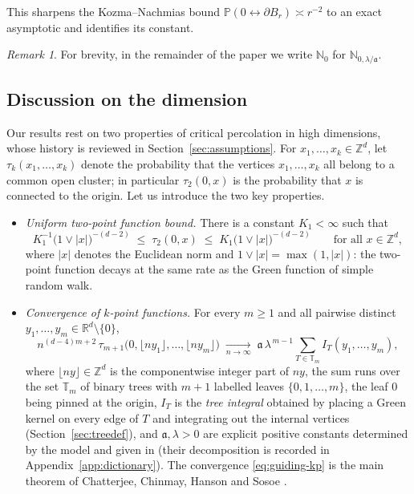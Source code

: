 \documentclass[11pt]{article}
\theoremstyle{definition}
\theoremstyle{remark}
\newtheorem{remark}[theorem]{Remark}
\newcommand{\R}{\mathbb{R}}
\newcommand{\Z}{\mathbb{Z}}
\newcommand{\bP}{\mathbb{P}}
\newcommand{\bN}{{\mathbb{N}_0}}                 %
\newcommand{\T}{\mathbb{T}}                    %
\newcommand{\fl}[1]{\lfloor #1\rfloor}
\numberwithin{equation}{section}
\theoremstyle{plain}
\theoremstyle{definition}
\theoremstyle{remark}
\theoremstyle{plain}
\begin{document}
This sharpens the Kozma--Nachmias bound
$\bP(0\leftrightarrow\partial B_r)\asymp r^{-2}$ \cite{KN11} to an exact
asymptotic and identifies its constant.

\begin{remark}
For brevity, in the remainder of the paper we write $\bN$ for $\mathbb{N}_{0,\lambda/\mathfrak a}$.
\end{remark}

\subsection{Discussion on the dimension}

Our results rest on two properties of critical percolation in high dimensions,
whose history is reviewed in Section~\ref{sec:assumptions}. For
$x_1,\dots,x_k\in\Z^d$, let $\tau_k(x_1,\dots,x_k)$ denote the probability
that the vertices $x_1,\dots,x_k$ all belong to a common open cluster; in
particular
$\tau_2(0,x)$ is the probability that $x$ is connected to the origin. Let us
introduce the two key properties.
\begin{itemize}
\item \emph{Uniform two-point function bound.} There is a constant $K_1<\infty$ such that
\begin{equation}\label{eq:2pt}
K_1^{-1}\bigl(1\vee|x|\bigr)^{-(d-2)}
\;\le\;\tau_2(0,x)\;\le\;
K_1\bigl(1\vee|x|\bigr)^{-(d-2)}
\qquad\text{for all }x\in\Z^d,
\end{equation}
where $|x|$ denotes the Euclidean norm and $1\vee|x|=\max(1,|x|)$: the
two-point function decays at the same rate as the Green function of simple
random walk.
\item \emph{Convergence of $k$-point functions.} For every $m\ge1$ and all pairwise distinct
$y_1,\dots,y_m\in\R^d\setminus\{0\}$,
\begin{equation}\label{eq:guiding-kp}
n^{(d-4)m+2}\,\tau_{m+1}\bigl(0,\fl{ny_1},\dots,\fl{ny_m}\bigr)
\;\xrightarrow[n\to\infty]{}\;
\mathfrak a\,\lambda^{\,m-1}\sum_{T\in\T_m}I_T(y_1,\dots,y_m),
\end{equation}
where $\fl{ny}\in\Z^d$ is the componentwise integer part of $ny$, the sum runs
over the set $\T_m$ of binary trees with $m+1$ labelled leaves $\{0,1,\dots,m\}$, the leaf $0$ being pinned at the origin, $I_T$ is the
\emph{tree integral} obtained by placing a Green kernel on every edge of $T$
and integrating out the internal vertices (Section~\ref{sec:treedef}), and $\mathfrak a,\lambda>0$ are explicit positive constants determined by the model and given in \cite{CCHS26} (their decomposition is recorded in Appendix~\ref{app:dictionary}). The convergence \eqref{eq:guiding-kp} is the main theorem of
Chatterjee, Chinmay, Hanson and Sosoe \cite{CCHS26}.
\end{itemize}
\end{document}
